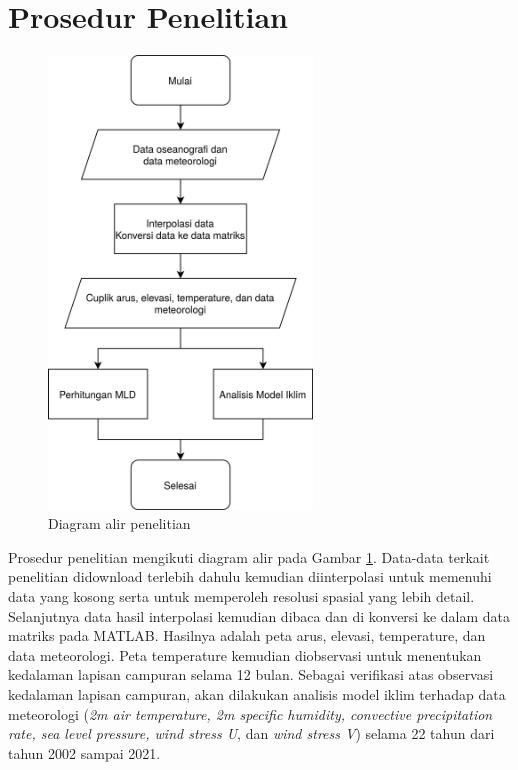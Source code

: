\section[Prosedur Penelitian]{Prosedur Penelitian}
\begin{spacing}{1.5}
	\begin{figure}[H]
		\centering
		\includegraphics[width=7cm]{contents/flowchart.png}
		\caption{Diagram alir penelitian}
		\label{fig:flowchart}
	\end{figure}
	Prosedur penelitian mengikuti diagram alir pada Gambar \ref{fig:flowchart}. Data-data terkait penelitian didownload terlebih dahulu kemudian diinterpolasi untuk memenuhi data yang kosong serta untuk memperoleh resolusi spasial yang lebih detail. Selanjutnya data hasil interpolasi kemudian dibaca dan di konversi ke dalam data matriks pada MATLAB. Hasilnya adalah peta arus, elevasi, temperature, dan data meteorologi. Peta temperature kemudian diobservasi untuk menentukan kedalaman lapisan campuran selama 12 bulan. Sebagai verifikasi atas observasi kedalaman lapisan campuran, akan dilakukan analisis model iklim terhadap data meteorologi (\textit{2m air temperature, 2m specific humidity, convective precipitation rate, sea level pressure, wind stress U}, dan \textit{wind stress V}) selama 22 tahun dari tahun 2002 sampai 2021.
\end{spacing}
\vspace{-0.5pc}

